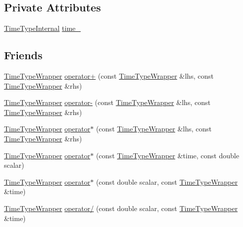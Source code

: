 \subsection*{Private Attributes}
\begin{DoxyCompactItemize}
\item 
\hyperlink{structvt_1_1_time_type_wrapper_a932f8d925e6c43e898fb8761ea667ef1}{Time\+Type\+Internal} \hyperlink{structvt_1_1_time_type_wrapper_ac00551d2803c7cb163ca08e70cbe7916}{time\+\_\+}
\end{DoxyCompactItemize}
\subsection*{Friends}
\begin{DoxyCompactItemize}
\item 
\hyperlink{structvt_1_1_time_type_wrapper}{Time\+Type\+Wrapper} \hyperlink{structvt_1_1_time_type_wrapper_ac539ef13d4f25ad2e1245134b4502e35}{operator+} (const \hyperlink{structvt_1_1_time_type_wrapper}{Time\+Type\+Wrapper} \&lhs, const \hyperlink{structvt_1_1_time_type_wrapper}{Time\+Type\+Wrapper} \&rhs)
\item 
\hyperlink{structvt_1_1_time_type_wrapper}{Time\+Type\+Wrapper} \hyperlink{structvt_1_1_time_type_wrapper_a15d79ec6de5debc18a0f4c91ab04b1f0}{operator-\/} (const \hyperlink{structvt_1_1_time_type_wrapper}{Time\+Type\+Wrapper} \&lhs, const \hyperlink{structvt_1_1_time_type_wrapper}{Time\+Type\+Wrapper} \&rhs)
\item 
\hyperlink{structvt_1_1_time_type_wrapper}{Time\+Type\+Wrapper} \hyperlink{structvt_1_1_time_type_wrapper_ac8858e68561056ede6fe89732125f11f}{operator$\ast$} (const \hyperlink{structvt_1_1_time_type_wrapper}{Time\+Type\+Wrapper} \&lhs, const \hyperlink{structvt_1_1_time_type_wrapper}{Time\+Type\+Wrapper} \&rhs)
\item 
\hyperlink{structvt_1_1_time_type_wrapper}{Time\+Type\+Wrapper} \hyperlink{structvt_1_1_time_type_wrapper_ab7cc197fd53b7a7a5b8fd78d9f4f5a25}{operator$\ast$} (const \hyperlink{structvt_1_1_time_type_wrapper}{Time\+Type\+Wrapper} \&time, const double scalar)
\item 
\hyperlink{structvt_1_1_time_type_wrapper}{Time\+Type\+Wrapper} \hyperlink{structvt_1_1_time_type_wrapper_a33285e8caada86dd610c4acd27471287}{operator$\ast$} (const double scalar, const \hyperlink{structvt_1_1_time_type_wrapper}{Time\+Type\+Wrapper} \&time)
\item 
\hyperlink{structvt_1_1_time_type_wrapper}{Time\+Type\+Wrapper} \hyperlink{structvt_1_1_time_type_wrapper_af0b641c1b9ea4c66e9056f20086c15d6}{operator/} (const double scalar, const \hyperlink{structvt_1_1_time_type_wrapper}{Time\+Type\+Wrapper} \&time)

\end{DoxyCompactItemize}
